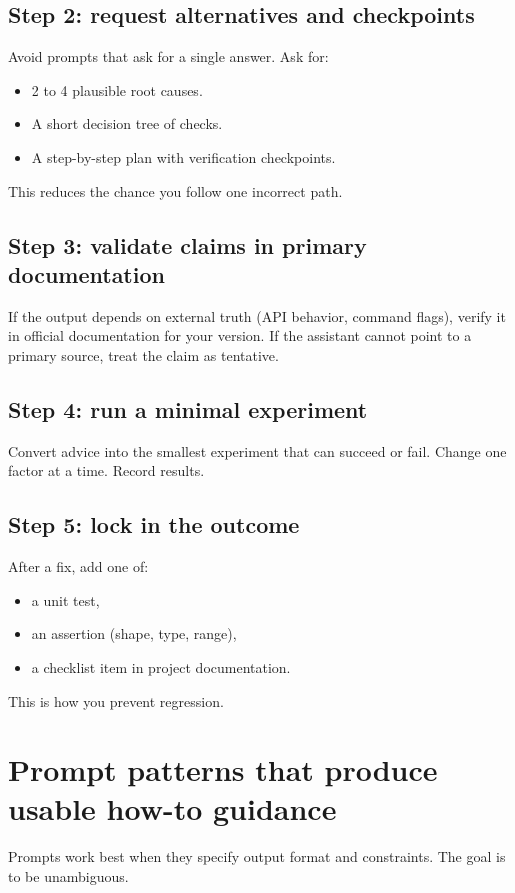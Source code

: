 \subsection{Step 2: request alternatives and checkpoints}
Avoid prompts that ask for a single answer. Ask for:
\begin{itemize}[noitemsep]
  \item 2 to 4 plausible root causes.
  \item A short decision tree of checks.
  \item A step-by-step plan with verification checkpoints.
\end{itemize}

This reduces the chance you follow one incorrect path.

\subsection{Step 3: validate claims in primary documentation}
If the output depends on external truth (API behavior, command flags), verify it in official documentation for your version. If the assistant cannot point to a primary source, treat the claim as tentative.

\subsection{Step 4: run a minimal experiment}
Convert advice into the smallest experiment that can succeed or fail. Change one factor at a time. Record results.

\subsection{Step 5: lock in the outcome}
After a fix, add one of:
\begin{itemize}[noitemsep]
  \item a unit test,
  \item an assertion (shape, type, range),
  \item a checklist item in project documentation.
\end{itemize}

This is how you prevent regression.

\section{Prompt patterns that produce usable how-to guidance}
Prompts work best when they specify output format and constraints. The goal is to be unambiguous.

